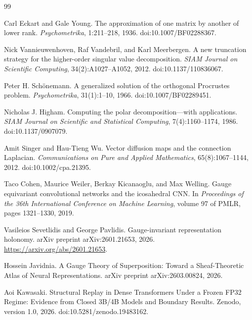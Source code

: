 \documentclass[11pt]{article}
\begin{document}
\begin{thebibliography}{99}

Carl Eckart and Gale Young.
\newblock The approximation of one matrix by another of lower rank.
\newblock \emph{Psychometrika}, 1:211--218, 1936.
\newblock doi:10.1007/BF02288367.

Nick Vannieuwenhoven, Raf Vandebril, and Karl Meerbergen.
\newblock A new truncation strategy for the higher-order singular value
decomposition.
\newblock \emph{SIAM Journal on Scientific Computing}, 34(2):A1027--A1052,
2012.
\newblock doi:10.1137/110836067.

Peter H. Sch\"onemann.
\newblock A generalized solution of the orthogonal Procrustes problem.
\newblock \emph{Psychometrika}, 31(1):1--10, 1966.
\newblock doi:10.1007/BF02289451.

Nicholas J. Higham.
\newblock Computing the polar decomposition---with applications.
\newblock \emph{SIAM Journal on Scientific and Statistical Computing},
7(4):1160--1174, 1986.
\newblock doi:10.1137/0907079.

Amit Singer and Hau-Tieng Wu.
\newblock Vector diffusion maps and the connection Laplacian.
\newblock \emph{Communications on Pure and Applied Mathematics},
65(8):1067--1144, 2012.
\newblock doi:10.1002/cpa.21395.

Taco Cohen, Maurice Weiler, Berkay Kicanaoglu, and Max Welling.
\newblock Gauge equivariant convolutional networks and the icosahedral CNN.
\newblock In \emph{Proceedings of the 36th International Conference on Machine
Learning}, volume 97 of PMLR, pages 1321--1330, 2019.

Vasileios Sevetlidis and George Pavlidis.
\newblock Gauge-invariant representation holonomy.
\newblock arXiv preprint arXiv:2601.21653, 2026.
\newblock \url{https://arxiv.org/abs/2601.21653}.

Hossein Javidnia.
\newblock A Gauge Theory of Superposition: Toward a Sheaf-Theoretic Atlas of
Neural Representations.
\newblock arXiv preprint arXiv:2603.00824, 2026.

Aoi Kawasaki.
\newblock Structural Replay in Dense Transformers Under a Frozen FP32 Regime:
Evidence from Closed 3B/4B Models and Boundary Results.
\newblock Zenodo, version 1.0, 2026.
\newblock doi:10.5281/zenodo.19483162.


\end{thebibliography}
\end{document}

